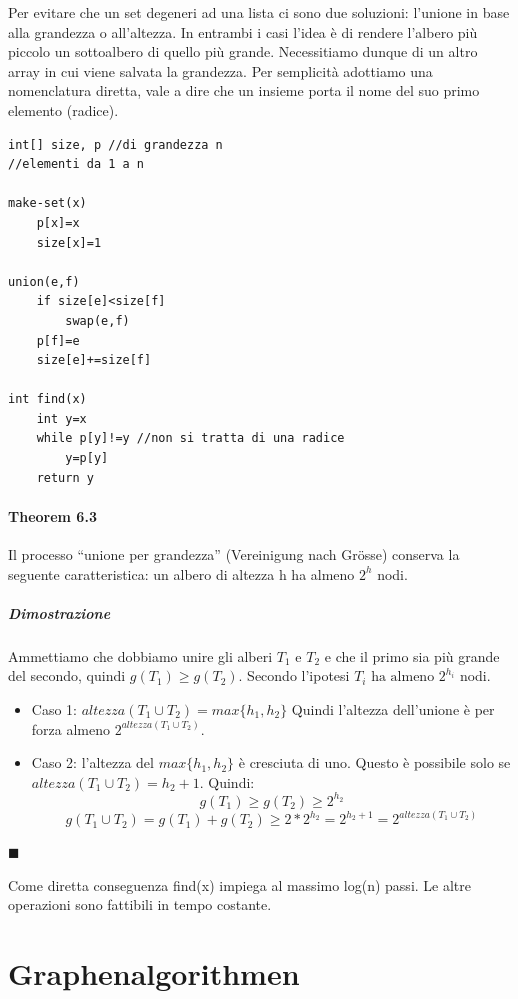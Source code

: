 \documentclass[a4paper]{book}
\newenvironment{mytheorem}[1]{\subsubsection*{Theorem #1}}{\begin{flushright}$\blacksquare$\end{flushright}}
\begin{document}
Per evitare che un set degeneri ad una lista ci sono due soluzioni: l'unione in base alla grandezza o all'altezza. In entrambi i casi l'idea è di rendere l'albero più piccolo un sottoalbero di quello più grande. Necessitiamo dunque di un altro array in cui viene salvata la grandezza. Per semplicità adottiamo una nomenclatura diretta, vale a dire che un insieme porta il nome del suo primo elemento (radice).
\begin{lstlisting}
int[] size, p //di grandezza n
//elementi da 1 a n

make-set(x)
	p[x]=x
	size[x]=1

union(e,f)
	if size[e]<size[f]
		swap(e,f)
	p[f]=e
	size[e]+=size[f]
	
int find(x)
	int y=x
	while p[y]!=y //non si tratta di una radice
		y=p[y]
	return y			
\end{lstlisting}
\begin{mytheorem}{6.3}
Il processo ``unione per grandezza'' (Vereinigung nach Grösse) conserva la seguente caratteristica: un albero di altezza h ha almeno $2^h$ nodi.
\paragraph*{Dimostrazione}
Ammettiamo che dobbiamo unire gli alberi $T_1 \mbox{ e } T_2$ e che il primo sia più grande del secondo, quindi $g(T_1)\geq g(T_2)$. Secondo l'ipotesi $T_i \mbox{ ha almeno } 2^{h_i}$ nodi. 
\begin{itemize}
\item Caso 1: $altezza(T_1 \cup T_2)=max\{h_1,h_2\}$
Quindi l'altezza dell'unione è per forza almeno $2^{altezza(T_1 \cup T_2)}$.
\item Caso 2: l'altezza del $max\{h_1,h_2\}$ è cresciuta di uno. Questo è possibile solo se $altezza(T_1 \cup T_2)=h_2+1$. Quindi:
$$g(T_1)\geq g(T_2) \geq 2^{h_2} $$
$$g(T_1 \cup T_2)=g(T_1)+g(T_2) \geq 2*2^{h_2}=2^{h_2+1}=2^{altezza(T_1 \cup T_2)}$$
\end{itemize}
\end{mytheorem}
Come diretta conseguenza find(x) impiega al massimo log(n) passi. Le altre operazioni sono fattibili in tempo costante.

\chapter{Graphenalgorithmen}
\end{document}
